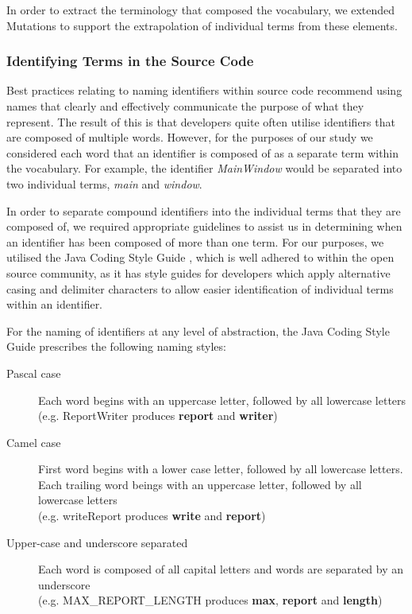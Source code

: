In order to extract the terminology that composed the vocabulary, we extended Mutations to support the extrapolation of individual terms from these elements.

\subsubsection{Identifying Terms in the Source Code} %
\label{ssub:identifying_terms_in_the_source_code}

Best practices relating to naming identifiers within source code recommend using names that clearly and effectively communicate the purpose of what they represent. The result of this is that developers quite often utilise identifiers that are composed of multiple words. However, for the purposes of our study we considered each word that an identifier is composed of as a separate term within the vocabulary. For example, the identifier \emph{MainWindow} would be separated into two individual terms, \emph{main} and \emph{window}. 

In order to separate compound identifiers into the individual terms that they are composed of, we required appropriate guidelines to assist us in determining when an identifier has been composed of more than one term. For our purposes, we utilised the Java Coding Style Guide \cite{Reddy00a}, which is well adhered to within the open source community, as it has style guides for developers which apply alternative casing and delimiter characters to allow easier identification of individual terms within an identifier.

For the naming of identifiers at any level of abstraction, the Java Coding Style Guide prescribes the following naming styles:

\begin{description}
	\item[Pascal case] Each word begins with an uppercase letter, followed by all lowercase letters\\ (e.g. ReportWriter produces \textbf{report} and \textbf{writer})
	\item[Camel case] First word begins with a lower case letter, followed by all lowercase letters. Each trailing word beings with an uppercase letter, followed by all lowercase letters\\ (e.g. writeReport produces \textbf{write} and \textbf{report})
	\item[Upper-case and underscore separated] Each word is composed of all capital letters and words are separated by an underscore\\ (e.g. MAX\_REPORT\_LENGTH produces \textbf{max}, \textbf{report} and \textbf{length})
\end{description}

